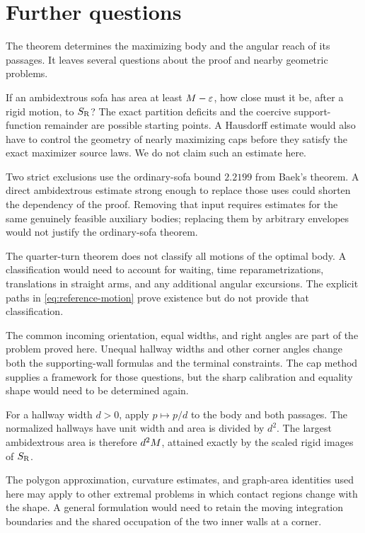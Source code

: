 \section{Further questions}\label{sec:questions}

The theorem determines the maximizing body and the angular reach of
its passages. It leaves several questions about the proof and nearby
geometric problems.

If an ambidextrous sofa has area at least $M-\varepsilon$, how close must
it be, after a rigid motion, to $S_{\mathrm R}$? The exact partition deficits
and the coercive support-function remainder are possible starting
points. A Hausdorff estimate would also have to control the geometry
of nearly maximizing caps before they satisfy the exact maximizer
source laws. We do not claim such an estimate here.

Two strict exclusions use the ordinary-sofa bound $2.2199$
from Baek's theorem. A direct ambidextrous estimate strong enough to
replace those uses could shorten the dependency of the proof.
Removing that input requires estimates for the same genuinely
feasible auxiliary bodies; replacing them by arbitrary envelopes
would not justify the ordinary-sofa theorem.

The quarter-turn theorem does not classify all motions of the
optimal body. A classification would need to account for waiting,
time reparametrizations, translations in straight arms, and any
additional angular excursions. The explicit paths in
\cref{eq:reference-motion} prove existence but do not provide that
classification.

The common incoming orientation, equal widths, and right angles are
part of the problem proved here. Unequal hallway widths and other
corner angles change both the supporting-wall formulas and the
terminal constraints. The cap method supplies a framework for those
questions, but the sharp calibration and equality shape would need
to be determined again.

For a hallway width $d>0$, apply $p\mapsto p/d$ to the body and
both passages. The normalized hallways have unit width and area is
divided by $d^2$. The largest ambidextrous area is therefore $d^2M$,
attained exactly by the scaled rigid images of $S_{\mathrm R}$.

The polygon approximation, curvature estimates, and graph-area
identities used here may apply to other extremal problems in which
contact regions change with the shape. A general formulation would
need to retain the moving integration boundaries and the shared
occupation of the two inner walls at a corner.
